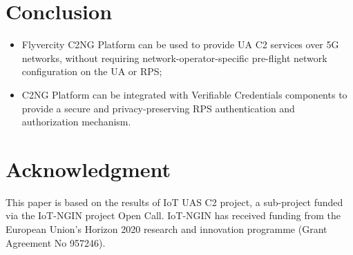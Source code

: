 \documentclass[a4paper,conference]{IEEEtran}
\begin{document}
\section{Conclusion}

\begin{itemize}
\item Flyvercity C2NG Platform can be used to provide UA C2 services over 5G networks, without requiring network-operator-specific pre-flight network configuration on the UA or RPS;
\item C2NG Platform can be integrated with Verifiable Credentials components to provide a secure and privacy-preserving RPS authentication and authorization mechanism.
\end{itemize}

\section*{Acknowledgment}

This paper is based on the results of IoT UAS C2 project, a sub-project funded via the IoT-NGIN project Open Call. IoT-NGIN has received funding from the European Union’s Horizon 2020 research and innovation programme (Grant Agreement No 957246).
\end{document}
